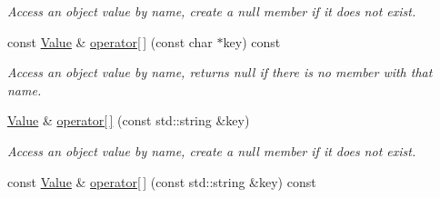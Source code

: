 \begin{DoxyCompactItemize}
\begin{DoxyCompactList}\small\item\em Access an object value by name, create a null member if it does not exist. \end{DoxyCompactList}\item 
\hypertarget{protocol_json_1_1_j_s_o_n___a_p_i_abe48631bc52b7503787da386a7ecba99}{const \hyperlink{protocol_json_1_1_j_s_o_n___a_p_i_a3a85c4423131080eb9300546d6130dfd}{Value} \& \hyperlink{protocol_json_1_1_j_s_o_n___a_p_i_abe48631bc52b7503787da386a7ecba99}{operator\mbox{[}$\,$\mbox{]}} (const char $\ast$key) const }\label{protocol_json_1_1_j_s_o_n___a_p_i_abe48631bc52b7503787da386a7ecba99}

\begin{DoxyCompactList}\small\item\em Access an object value by name, returns null if there is no member with that name. \end{DoxyCompactList}\item 
\hypertarget{protocol_json_1_1_j_s_o_n___a_p_i_ae9013b28547b7723932674da5fe738d6}{\hyperlink{protocol_json_1_1_j_s_o_n___a_p_i_a3a85c4423131080eb9300546d6130dfd}{Value} \& \hyperlink{protocol_json_1_1_j_s_o_n___a_p_i_ae9013b28547b7723932674da5fe738d6}{operator\mbox{[}$\,$\mbox{]}} (const std\-::string \&key)}\label{protocol_json_1_1_j_s_o_n___a_p_i_ae9013b28547b7723932674da5fe738d6}

\begin{DoxyCompactList}\small\item\em Access an object value by name, create a null member if it does not exist. \end{DoxyCompactList}\item 
\hypertarget{protocol_json_1_1_j_s_o_n___a_p_i_ae6d008b652a42b7d67d91114193df82b}{const \hyperlink{protocol_json_1_1_j_s_o_n___a_p_i_a3a85c4423131080eb9300546d6130dfd}{Value} \& \hyperlink{protocol_json_1_1_j_s_o_n___a_p_i_ae6d008b652a42b7d67d91114193df82b}{operator\mbox{[}$\,$\mbox{]}} (const std\-::string \&key) const }\label{protocol_json_1_1_j_s_o_n___a_p_i_ae6d008b652a42b7d67d91114193df82b}


\end{DoxyCompactItemize}

